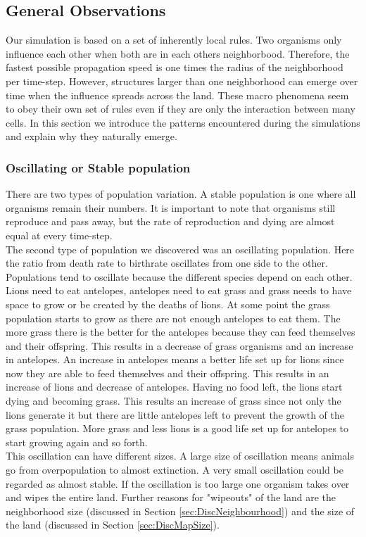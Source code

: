 \documentclass[11pt]{article}
\begin{document}
\subsection{General Observations}
Our simulation is based on a set of inherently local rules. Two organisms only influence each other when both are in each others neighborbood. Therefore, the fastest possible propagation speed is one times the radius of the neighborhood per time-step. However, structures larger than one neighborhood can emerge over time when the influence spreads across the land. These macro phenomena seem to obey their own set of rules even if they are only the interaction between many cells. 
In this section we introduce the patterns encountered during the simulations and explain why they naturally emerge.

\subsubsection{Oscillating or Stable population}
There are two types of population variation. A stable population is one where all organisms remain their numbers. It is important to note that organisms still reproduce and pass away, but the rate of reproduction and dying are almost equal at every time-step.\\
The second type of population we discovered was an oscillating population. Here the ratio from death rate to birthrate oscillates from one side to the other. Populations tend to oscillate because the different species depend on each other. Lions need to eat antelopes, antelopes need to eat grass and grass needs to have space to grow or be created by the deaths of lions. At some point the grass population starts to grow as there are not enough antelopes to eat them. The more grass there is the better for the antelopes because they can feed themselves and their offspring. This results in a decrease of grass organisms and an increase in antelopes. An increase in antelopes means a better life set up for lions since now they are able to feed themselves and their offspring. This results in an increase of lions and decrease of antelopes. Having no food left, the lions start dying and becoming grass. This results an increase of grass since not only the lions generate it but there are little antelopes left to prevent the growth of the grass population. More grass and less lions is a good life set up for antelopes to start growing again and so forth.\\
This oscillation can have different sizes. A large size of oscillation means animals go from overpopulation to almost extinction. A very small oscillation could be regarded as almost stable. If the oscillation is too large one organism takes over and wipes the entire land. Further reasons for "wipeouts" of the land are the neighborhood size (discussed in Section \ref{sec:DiscNeighbourhood}) and the size of the land (discussed in Section \ref{sec:DiscMapSize}).\\
\end{document}
